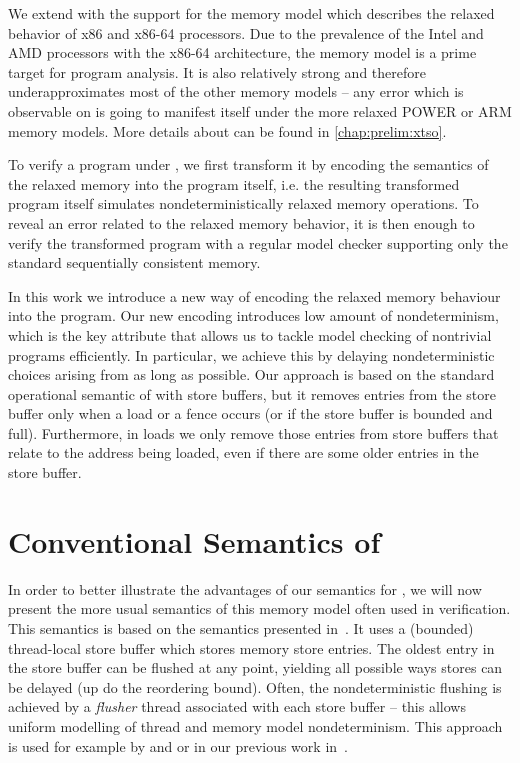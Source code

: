 We extend \divine with the support for the \xtso memory model 
which describes the relaxed behavior of x86 and x86-64 processors.
Due to the prevalence of the Intel and AMD processors with the x86-64
architecture, the \xtso memory model is a prime target for program analysis.
It is also relatively strong and therefore underapproximates most of the other
memory models -- any error which is observable on \xtso is going to manifest
itself under the more relaxed POWER or ARM memory models.
More details about \xtso can be found in \autoref{chap:prelim:xtso}.

To verify a program under \xtso, we first transform it by encoding the
semantics of the relaxed memory into the program itself, i.e. the resulting
transformed program itself simulates nondeterministically relaxed memory
operations.
To reveal an error related to the relaxed memory behavior, it is then enough to
verify the transformed program with a regular model checker supporting only the
standard sequentially consistent memory.

In this work we introduce a new way of encoding the relaxed memory behaviour
into the program.
Our new encoding introduces low amount of nondeterminism, which is the key
attribute that allows us to tackle model checking of nontrivial programs
efficiently.
In particular, we achieve this by delaying nondeterministic choices arising
from \xtso as long as possible.
Our approach is based on the standard operational semantic of \xtso with store
buffers, but it removes entries from the store buffer only when a load or a
fence occurs (or if the store buffer is bounded and full).
Furthermore, in loads we only remove those entries from store buffers that
relate to the address being loaded, even if there are some older entries in the
store buffer.


\section{Conventional Semantics of \xtso}

In order to better illustrate the advantages of our semantics for \xtso, we
will now present the more usual semantics of this memory model often used in
verification.
This semantics is based on the \xtso semantics presented in~.
It uses a (bounded) thread-local store buffer which stores memory store entries.
The oldest entry in the store buffer can be flushed at any point, yielding all
possible ways stores can be delayed (up do the reordering bound).
Often, the nondeterministic flushing is achieved by a \emph{flusher} thread
associated with each store buffer -- this allows uniform modelling of thread
and memory model nondeterminism.
This approach is used for example by  and 
or in our previous work in~.

